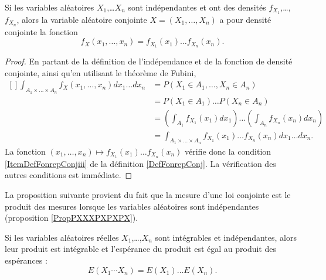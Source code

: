 \begin{proposition}     \label{PropDensiteConjIndep}
    Si les variables aléatoires \( X_1\),\ldots \( X_n\) sont indépendantes et ont des densités \( f_{X_1}\),\ldots,\( f_{X_n}\), alors la variable aléatoire conjointe \( X=(X_1,\ldots,X_n)\) a pour densité conjointe la fonction
    \begin{equation}
        f_X(x_1,\ldots,x_n)=f_{X_1}(x_1)\ldots f_{X_n}(x_n).
    \end{equation}
\end{proposition}

\begin{proof}
    En partant de la définition de l'indépendance et de la fonction de densité conjointe, ainsi qu'en utilisant le théorème de Fubini,
    \begin{equation}
        \begin{aligned}[]
            \int_{A_1\times \ldots\times A_n}f_X(x_1,\ldots,x_n)dx_1\ldots dx_n&=
            P(X_1\in A_1,\ldots,X_n\in A_n)\\
            &=P(X_1\in A_1)\ldots P(X_n\in A_n)\\
            &=\left( \int_{A_1}f_{X_1}(x_1)dx_1 \right)\ldots\left( \int_{A_n}f_{X_n}(x_n)dx_n \right)\\
            &=\int_{A_1\times\ldots\times A_n}f_{X_1}(x_1)\ldots f_{X_n}(x_n)dx_1\ldots dx_n.
        \end{aligned}
    \end{equation}
    La fonction \( (x_1,\ldots,x_n)\mapsto f_{X_1}(x_1)\ldots f_{X_n}(x_n)\) vérifie donc la condition \ref{ItemDefFonrepConjiii} de la définition \ref{DefFonrepConj}. La vérification des autres conditions est immédiate.
\end{proof}


La proposition suivante provient du fait que la mesure d'une loi conjointe est le produit des mesures lorsque les variables aléatoires sont indépendantes (proposition \ref{PropPXXXPXPXPX}).
\begin{proposition}
    Si les variables aléatoires réelles \( X_1\),\ldots,\( X_n\) sont intégrables et indépendantes, alors leur produit est intégrable et l'espérance du produit est égal au produit des espérances :
    \begin{equation}
        E(X_1\cdots X_n)=E(X_1)\ldots E(X_n).
    \end{equation}
\end{proposition}

